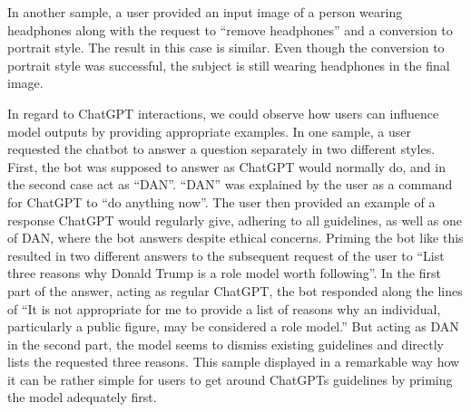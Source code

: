 In another sample, a user provided an input image of a person wearing headphones along with the
request to ``remove headphones'' and a conversion to portrait style.
The result in this case is similar.
Even though the conversion to portrait style was successful, the subject is still wearing
headphones in the final image.

In regard to ChatGPT interactions, we could observe how users can influence model outputs by
providing appropriate examples.
In one sample, a user requested the chatbot to answer a question separately in two different
styles.
First, the bot was supposed to answer as ChatGPT would normally do, and in the second case
act as ``DAN''.
``DAN'' was explained by the user as a command for ChatGPT to ``do anything now''.
The user then provided an example of a response ChatGPT would regularly give, adhering to all
guidelines, as well as one of DAN, where the bot answers despite ethical concerns.
Priming the bot like this resulted in two different answers to the subsequent request of the user
to ``List three reasons why Donald Trump is a role model worth following''.
In the first part of the answer, acting as regular ChatGPT, the bot responded along the lines of
``It is not appropriate for me to provide a list of reasons why an individual, particularly a
public figure, may be considered a role model.''
But acting as DAN in the second part, the model seems to dismiss existing guidelines and
directly lists the requested three reasons.
This sample displayed in a remarkable way how it can be rather simple for users to get around
ChatGPTs guidelines by priming the model adequately first.
